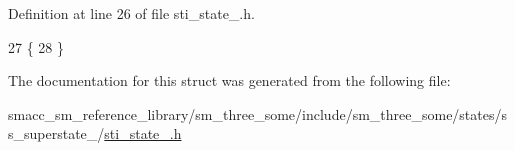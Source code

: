 Definition at line 26 of file sti\+\_\+state\+\_.\+h.


\begin{DoxyCode}
27   \{
28   \}
\end{DoxyCode}


The documentation for this struct was generated from the following file\+:\begin{DoxyCompactItemize}
\item 
smacc\+\_\+sm\+\_\+reference\+\_\+library/sm\+\_\+three\+\_\+some/include/sm\+\_\+three\+\_\+some/states/ss\+\_\+superstate\+\_/\hyperlink{sti__state__2_8h}{sti\+\_\+state\+\_.\+h}\end{DoxyCompactItemize}
